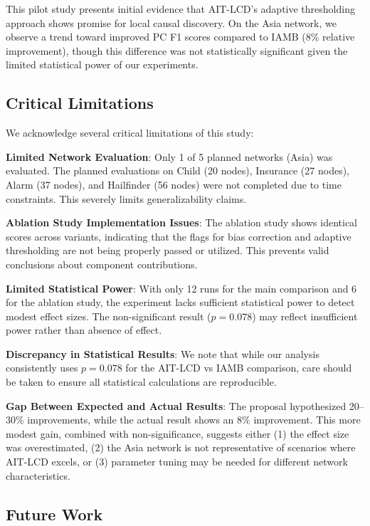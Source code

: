\documentclass{article}
\theoremstyle{plain}
\theoremstyle{definition}
\begin{document}
This pilot study presents initial evidence that AIT-LCD's adaptive thresholding approach shows promise for local causal discovery. On the Asia network, we observe a trend toward improved PC F1 scores compared to IAMB (8\% relative improvement), though this difference was not statistically significant given the limited statistical power of our experiments.

\subsection{Critical Limitations}

We acknowledge several critical limitations of this study:

\textbf{Limited Network Evaluation}: Only 1 of 5 planned networks (Asia) was evaluated. The planned evaluations on Child (20 nodes), Insurance (27 nodes), Alarm (37 nodes), and Hailfinder (56 nodes) were not completed due to time constraints. This severely limits generalizability claims.

\textbf{Ablation Study Implementation Issues}: The ablation study shows identical scores across variants, indicating that the flags for bias correction and adaptive thresholding are not being properly passed or utilized. This prevents valid conclusions about component contributions.

\textbf{Limited Statistical Power}: With only 12 runs for the main comparison and 6 for the ablation study, the experiment lacks sufficient statistical power to detect modest effect sizes. The non-significant result ($p = 0.078$) may reflect insufficient power rather than absence of effect.

\textbf{Discrepancy in Statistical Results}: We note that while our analysis consistently uses $p = 0.078$ for the AIT-LCD vs IAMB comparison, care should be taken to ensure all statistical calculations are reproducible.

\textbf{Gap Between Expected and Actual Results}: The proposal hypothesized 20--30\% improvements, while the actual result shows an 8\% improvement. This more modest gain, combined with non-significance, suggests either (1) the effect size was overestimated, (2) the Asia network is not representative of scenarios where AIT-LCD excels, or (3) parameter tuning may be needed for different network characteristics.

\subsection{Future Work}
\end{document}
